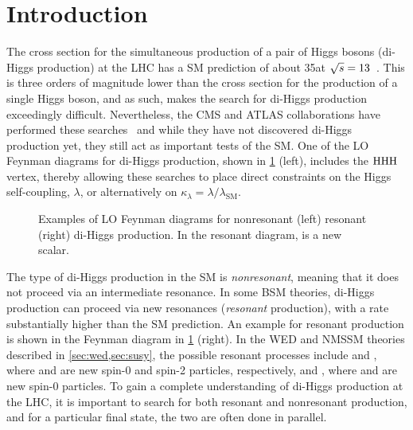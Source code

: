 \section{Introduction}\label{sec:ggtt_intro}
The cross section for the simultaneous production of a pair of Higgs bosons (di-Higgs production) at the LHC has a SM prediction of about 35\fb at $\sqrt{s}=13$\TeV~\cite{LHCHiggsCrossSectionWorkingGroup:2016ypw}. This is three orders of magnitude lower than the cross section for the production of a single Higgs boson, and as such, makes the search for di-Higgs production exceedingly difficult. Nevertheless, the CMS and ATLAS collaborations have performed these searches~\cite{CMS:2024awa,CMS-PAS-HIG-20-011,ATLAS:2024ish} and while they have not discovered di-Higgs production yet, they still act as important tests of the SM. One of the LO Feynman diagrams for di-Higgs production, shown in \cref{fig:dihiggs_feynman} (left), includes the $\mathrm{H}\mathrm{H}\mathrm{H}$ vertex, thereby allowing these searches to place direct constraints on the Higgs self-coupling, $\lambda$, or alternatively on $\kappa_\lambda = \lambda / \lambda_{\text{SM}}$.

\begin{figure}
  \centering
   \hspace{1cm}
  \caption[LO Feynman Diagrams for Nonresonant and Resonant Di-Higgs Production]{Examples of LO Feynman diagrams for nonresonant (left) resonant (right) di-Higgs production. In the resonant diagram, \PY is a new scalar.}\label{fig:dihiggs_feynman}
\end{figure}

The type of di-Higgs production in the SM is \textit{nonresonant}, meaning that it does not proceed via an intermediate resonance. In some BSM theories, di-Higgs production can proceed via new resonances (\textit{resonant} production), with a rate substantially higher than the SM prediction. An example for resonant production is shown in the Feynman diagram in \cref{fig:dihiggs_feynman} (right). In the WED and NMSSM theories described in \cref{sec:wed,sec:susy}, the possible resonant processes include \XZeroHH and \XTwoHH, where \XZero and \XTwo are new spin-0 and spin-2 particles, respectively, and \XYH, where \PX and \PY are new spin-0 particles. To gain a complete understanding of di-Higgs production at the LHC, it is important to search for both resonant and nonresonant production, and for a particular final state, the two are often done in parallel.

